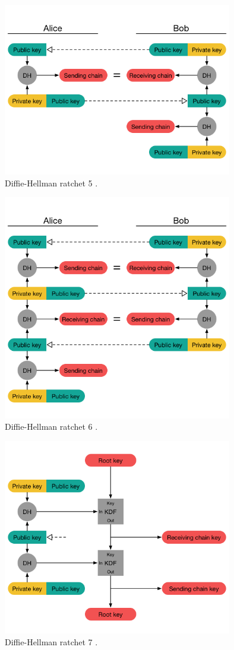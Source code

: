 \begin{figure}[H]
	\centering
	\includegraphics[width=10cm]{figures/dhratchet5.png}
	\caption{Diffie-Hellman ratchet 5 \cite{doubleratchet}.}
	\label{fig:dhratchet5}
\end{figure}

\begin{figure}[H]
	\centering
	\includegraphics[width=10cm]{figures/dhratchet6.png}
	\caption{Diffie-Hellman ratchet 6 \cite{doubleratchet}.}
	\label{fig:dhratchet6}
\end{figure}

\begin{figure}[H]
	\centering
	\includegraphics[width=10cm]{figures/dhratchet7.png}
	\caption{Diffie-Hellman ratchet 7 \cite{doubleratchet}.}
	\label{fig:dhratchet7}
\end{figure}

